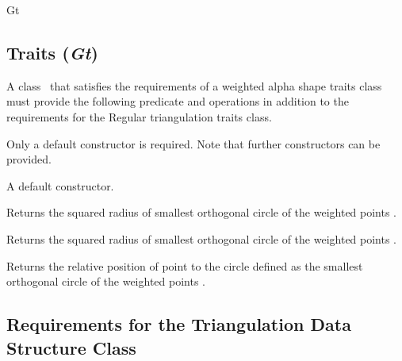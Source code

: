 \begin{ccClass} {Gt}
\subsection*{Traits (\mbox{\it Gt})}


\ccDefinition
A class \ccClassName\ that satisfies the requirements of a weighted alpha shape
traits class must provide the following predicate and operations in
addition to the requirements for the Regular triangulation traits
class.

\ccTypes


\ccCreation

Only a default constructor is required. Note that further constructors
can be provided. 

{A default constructor.}


\ccOperations

{Returns the squared radius of smallest orthogonal circle of the
weighted points . }

{Returns the squared radius of smallest orthogonal circle of the
weighted points . }

{Returns the relative position of point  to the circle
defined as the smallest orthogonal circle of the weighted points .}

\end{ccClass}

\subsection{Requirements for the Triangulation Data Structure Class}

